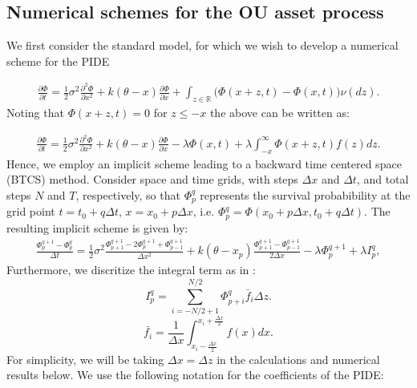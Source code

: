 \documentclass[11pt,reqno]{article}
\theoremstyle{definition}
\begin{document}
\subsection{Numerical schemes for the OU asset process}
We first consider the standard model, for which we wish to develop a numerical scheme for the PIDE

\begin{eqnarray} \label{pide3}
\frac{\partial \Phi}{\partial t}=\frac{1}{2} \sigma^{2} \frac{\partial^{2} \Phi}{\partial x^{2}}+k(\theta-x) \frac{\partial \Phi}{\partial x}  +\int_{z \in \mathbb{R}}\Big(\Phi(x+z,t)-\Phi(x,t)\Big) \nu(dz). 
\end{eqnarray}
Noting that $\Phi(x+z,t)=0$ for $z \leq -x$ the above can be written as:

\begin{eqnarray} \label{pide4}
\frac{\partial \Phi}{\partial t}=\frac{1}{2} \sigma^{2} \frac{\partial^{2} \Phi}{\partial x^{2}}+k(\theta-x) \frac{\partial \Phi}{\partial x}  - \lambda \Phi(x,t)+\lambda \int_{-x}^{\infty}\Phi(x+z,t)f(z)dz.
\end{eqnarray}
Hence, we employ an implicit scheme leading to a backward time centered space (BTCS) method. Consider space and time grids, with steps  $\Delta x$ and $\Delta t$, and total steps $N$ and $T$, respectively, so that $\Phi^q_{p}$ represents the survival probabibility at the grid point $t=t_0+ q\Delta t$, $x=x_0+p\Delta x$, i.e. $\Phi^q_p = \Phi(x_0+p \Delta x,t_0+ q\Delta t)$. The resulting implicit scheme is given by:
\begin{eqnarray}\label{BTCS}
\frac{\Phi_{p}^{q+1}-\Phi_{p}^{q}}{\Delta t}=\frac{1}{2}\sigma^2 \frac{\Phi_{p+1}^{q+1}-2 \Phi_{p}^{q+1}+\Phi_{p-1}^{q+1}}{\Delta x^2}+k(\theta - x_p) \frac{\Phi_{p+1}^{q+1}-\Phi_{p-1}^{q+1}}{2 \Delta x} - \lambda \Phi_{p}^{q+1}+\lambda I_{p}^{q},
\end{eqnarray} 
Furthermore, we discritize the integral term as in \cite{d2005robust}:
$$I^q_p = \sum_{i=-N/2+1}^{N/2}\Phi_{p+i}^{q} \bar{f}_{i} \Delta z.$$
$$ \bar{f_i} = \frac{1}{\Delta x}\int_{x_i-\frac{\Delta x}{2}}^{x_i+\frac{\Delta x}{2}} f(x)dx.$$ 
For simplicity, we will be taking $\Delta x = \Delta z$ in the calculations and numerical results below. %
We use the following notation for the coefficients of the PIDE:
\end{document}

